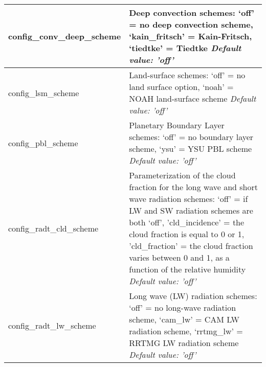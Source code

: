 {\begin{longtable}{|p{2.0in} |p{4.25in}|}
  config\_conv\_deep\_scheme & Deep convection schemes: \newline
                                             `off' = no deep convection scheme, \newline
                                             `kain\_fritsch' = Kain-Fritsch, \newline 
                                             `tiedtke' = Tiedtke \newline
  {\em Default value: 'off'} \\ \hline

  config\_lsm\_scheme & Land-surface schemes: \newline
                                             `off' = no land surface option, \newline
                                             `noah' = NOAH land-surface scheme \newline                                              
  {\em Default value: 'off'} \\ \hline

  config\_pbl\_scheme & Planetary Boundary Layer schemes: \newline
                                             `off' = no boundary layer scheme, \newline
                                             `ysu' = YSU PBL scheme \newline 
  {\em Default value: 'off'} \\ \hline

  config\_radt\_cld\_scheme & Parameterization of the cloud fraction for the long wave and short wave radiation schemes: \newline
                                              `off' = if LW and SW radiation schemes are both `off', \newline
                                              'cld\_incidence' = the cloud fraction is equal to 0 or 1, \newline
                                              'cld\_fraction' = the cloud fraction varies between 0 and 1,  as a function of the relative humidity \newline
   {\em Default value: 'off'} \\ \hline

  config\_radt\_lw\_scheme & Long wave (LW) radiation schemes: \newline
                                             `off' = no long-wave radiation scheme, \newline
                                             `cam\_lw' = CAM LW radiation scheme, \newline 
                                             `rrtmg\_lw' = RRTMG LW radiation scheme \newline
  {\em Default value: 'off'} \\ \hline


\end{longtable}}
